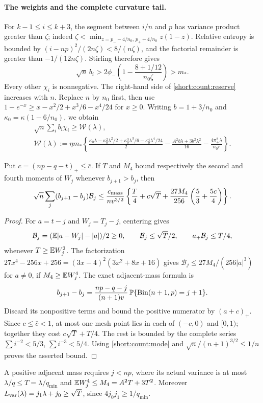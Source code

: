 \paragraph{The weights and the complete curvature tail.}
For $k-1\le i\le k+3$, the segment between $i/n$ and $p$ has variance
product greater than $\zeta$; indeed
$\zeta<\min_{z=p_- -4/n_0,\,p_++4/n_0}z(1-z)$.
Relative entropy is bounded by $(i-np)^2/(2n\zeta)<8/(n\zeta)$,
and the factorial remainder is greater than $-1/(12n\zeta)$.
Stirling therefore gives
\[
 \sqrt n\,b_i>2\phi_-\left(1-\frac{8+1/12}{n_0\zeta}\right)>m_*.
\]
Every other $\chi_i$ is nonnegative. The right-hand side of
\eqref{short:count:reserve} increases with $n$. Replace $n$ by $n_0$ first,
then use $1-e^{-x}\ge x-x^2/2+x^3/6-x^4/24$ for $x\ge0$.
Writing $b=1+3/n_0$ and $\kappa_0=\kappa(1-6/n_0)$, we obtain
\begin{equation}\label{short:count:W}
\begin{gathered}
 \sqrt n\sum_i b_i\chi_i\ge\mathcal W(\lambda),\\
 \mathcal W(\lambda):=\eta m_*\left\{
 \frac{\kappa_0\lambda-\kappa_0^2\lambda^2/2+\kappa_0^3\lambda^3/6-\kappa_0^4\lambda^4/24}{2}
 -\frac{A^2b\lambda+3b^2\lambda^2}{16}
 -\frac{4\pi_+^2\lambda}{n_0r}\right\}.
\end{gathered}
\end{equation}

\begin{lemma}
\label{short:count:variation-lemma}
Put $c=(np-q-t)_+\le\bar c$. If $T$ and $M_4$ bound respectively
the second and fourth moments of $W_j$ whenever $b_{j+1}>b_j$, then
\begin{equation}\label{short:count:curvature}
 \sqrt n\sum_j(b_{j+1}-b_j)\mathcal B_j
 \le\frac{c_{\rm mass}}{nv^{3/2}}
 \left\{\frac T4+c\sqrt T+
       \frac{27M_4}{256}\left(\frac53+\frac{5c}4\right)\right\}.
\end{equation}
\end{lemma}
\begin{proof}
For $a=t-j$ and $W_j=T_j-j$, centering gives
\[
 \mathcal B_j=(\mathbb E|a-W_j|-|a|)/2\ge0,\qquad
 \mathcal B_j\le\sqrt T/2,\qquad a_+\mathcal B_j\le T/4,
\]
whenever $T\ge\mathbb E W_j^2$. The factorization
$27x^4-256x+256=(3x-4)^2(3x^2+8x+16)$ gives
$\mathcal B_j\le27M_4/(256|a|^3)$ for $a\ne0$, if $M_4\ge\mathbb E W_j^4$.
The exact adjacent-mass formula is
\[
 b_{j+1}-b_j
 =\frac{np-q-j}{(n+1)v}\,
       \mathbb P\{\operatorname{Bin}(n+1,p)=j+1\}.
\]
Discard its nonpositive terms and bound the positive numerator by
$(a+c)_+$. Since $c\le\bar c<1$, at most one mesh point lies in each
of $(-c,0)$ and $[0,1)$; together they cost $c\sqrt T+T/4$.
The rest is bounded by the complete series
$\sum i^{-2}<5/3$, $\sum i^{-3}<5/4$. Using
\eqref{short:count:mode} and $\sqrt n/(n+1)^{3/2}\le1/n$ proves the asserted bound.
\end{proof}
A positive adjacent mass requires $j<np$, where its actual variance
is at most $\lambda/q\le T=\lambda/q_{\min}$ and
$\mathbb E W_j^4\le M_4=A^2T+3T^2$.
Moreover $L_{\rm var}(\lambda)=j_1\lambda+j_0\ge\sqrt T$, since
$4j_0j_1\ge1/q_{\min}$.

